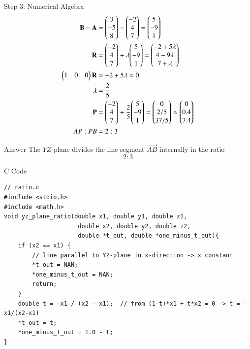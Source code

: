 \documentclass{beamer}
\begin{document}
\begin{frame}{Step 3: Numerical Algebra}
\begin{align}
\mathbf{B}-\mathbf{A} &= \mathbf{\begin{pmatrix}3\\-5\\8\end{pmatrix}-\begin{pmatrix}-2\\4\\7\end{pmatrix}} = \mathbf{\begin{pmatrix}5\\-9\\1\end{pmatrix}} \label{eq:B_minus_A} \\
\mathbf{R} &= \mathbf{\begin{pmatrix}-2\\4\\7\end{pmatrix}} + \lambda \mathbf{\begin{pmatrix}5\\-9\\1\end{pmatrix}} = \mathbf{\begin{pmatrix}-2 + 5\lambda\\ 4 - 9\lambda\\ 7 + \lambda\end{pmatrix}} \label{eq:R_numeric} \\
\begin{pmatrix}1 & 0 & 0\end{pmatrix} \mathbf{R} &= -2 + 5\lambda = 0 \label{eq:solve_lambda} \\
\lambda &= \frac{2}{5} \label{eq:lambda_final} \\
\mathbf{P} &= \mathbf{\begin{pmatrix}-2\\4\\7\end{pmatrix}} + \frac{2}{5}\mathbf{\begin{pmatrix}5\\-9\\1\end{pmatrix}} = \mathbf{\begin{pmatrix}0\\ 2/5 \\ 37/5\end{pmatrix}} \approx \mathbf{\begin{pmatrix}0\\0.4\\7.4\end{pmatrix}} \label{eq:P_numeric} \\
AP : PB &= 2 : 3 \label{eq:final_ratio}
\end{align}
\end{frame}

\begin{frame}{Answer}
The $YZ$-plane divides the line segment $\vec{AB}$ internally in the ratio
$$
\boxed{2:3}
$$


\end{frame}

\begin{frame}[fragile]{C Code}
\begin{lstlisting}
// ratio.c
#include <stdio.h>
#include <math.h>
void yz_plane_ratio(double x1, double y1, double z1,
                     double x2, double y2, double z2,
                     double *t_out, double *one_minus_t_out){
    if (x2 == x1) {
        // line parallel to YZ-plane in x-direction -> x constant
        *t_out = NAN;
        *one_minus_t_out = NAN;
        return;
    }
    double t = -x1 / (x2 - x1);  // from (1-t)*x1 + t*x2 = 0 -> t = -x1/(x2-x1)
    *t_out = t;
    *one_minus_t_out = 1.0 - t;
}
  \end{lstlisting}
\end{frame}
\end{document}
